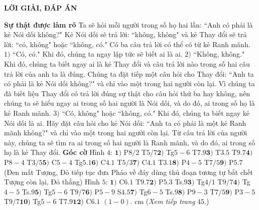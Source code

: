 \vspace*{5pt}
\centerline{\Large\textbf{\color{cackithi}LỜI GIẢI, ĐÁP ÁN}}

\vspace*{-5pt}
\begin{multicols}{2}
	\textbf{\color{cackithi}Sự thật được làm rõ}
	\vskip 0.1cm
	Ta sẽ hỏi mỗi người trong số họ hai lần: ``Anh có phải là kẻ Nói dối không?"
	\vskip 0.1cm
	Kẻ Nói dối sẽ trả lời: ``không, không" và kẻ Thay đổi sẽ trả lời: ``có, không" hoặc ``không, có." Có ba câu trả lời có thể có từ kẻ Ranh mãnh.
	\vskip 0.1cm
	$1)$ ``Có, có." Khi đó, chúng ta ngay lập tức sẽ biết ai là ai.
	\vskip 0.1cm
	$2)$ ``Không, không." Khi  đó, chúng ta biết ngay ai là kẻ Thay đổi và câu trả lời nào trong số hai câu trả lời của anh ta là đúng. Chúng ta  đặt tiếp một câu hỏi cho Thay đổi: ``Anh ta có phải là kẻ Nói dối không?" và chỉ vào một trong hai người còn lại. Vì chúng ta đã biết liệu Thay đổi có trả lời đúng sự thật cho câu hỏi thứ ba hay không, nên chúng ta sẽ hiểu ngay ai trong số hai người là Nói dối, và do đó, ai trong số họ là kẻ Ranh mãnh.
	\vskip 0.1cm
	$3)$ ``Có, không" hoặc ``không, có." Khi đó, chúng ta  biết ngay kẻ Nói dối là ai. Hãy đặt câu hỏi cho kẻ  Nói dối: ``Anh ta có phải là một kẻ Ranh mãnh không?" và chỉ vào một trong hai người còn lại. Từ câu trả lời của người này, chúng ta sẽ tìm ra ai trong số hai người là Ranh mãnh, và do đó, ai trong số họ là kẻ Thay đổi.
	\vskip 0.1cm
	\textbf{\color{cackithi}Góc cờ}
	\vskip 0.1cm
	Hình $4$: $\pmb{1)}$ P$8/2$ T$5/7$\quad  $\pmb{2)}$ Tg$5-6$ T$7.9$\quad $\pmb{3)}$ T$3.5$ T$9.7$\quad $\pmb{4)}$ P$8-4$ T$3/5$\quad $\pmb{5)}$ C$5-4$ Tg$5.1$\quad $\pmb{6)}$ C$4.1$ T$5/3$\quad $\pmb{7)}$ C$4.1$ T$3.1$\quad $\pmb{8)}$ P$4-5$ T$7/5$\quad $\pmb{9)}$ P$5.7$ (Đen mất Tượng, Đỏ tiếp tục đưa Pháo về đáy dùng thủ đoạn tương tự bắt chết Tượng còn lại, Đỏ thắng)
	\vskip 0.1cm
	Hình $5$: $\pmb{1)}$ C$6.1$ T$9.7$\quad $\pmb{2)}$ P$5.3$ Ts$.9$\quad  $\pmb{3)}$ Tg$4/1$ T$9/7$\quad $\pmb{4)}$ Tg$4-5$ Ts$.9$\quad $\pmb{5)}$ Tg$5-6$ T$9/7$\quad $\pmb{6)}$ P$5-9$ S$4.5$\quad $\pmb{7)}$ Tg$6-5$ Ts$.9$\quad  $\pmb{8)}$ P$9-3$ T$7/5$\quad $\pmb{9)}$ P$3-5$ T$9/7$\quad $\pmb{10)}$ Tg$5-6$ T$7.9$\quad $\pmb{12)}$ C$6.1$ $(1-0)$.
	 cm
	\hfill (\textit{Xem tiếp trang} $45$.)
\end{multicols}